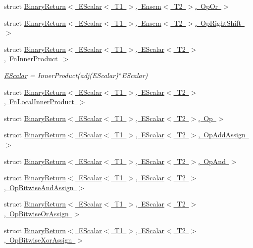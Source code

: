 \begin{DoxyCompactItemize}
\item 
struct \mbox{\hyperlink{structENSEM_1_1BinaryReturn_3_01EScalar_3_01T1_01_4_00_01Ensem_3_01T2_01_4_00_01OpOr_01_4}{Binary\+Return$<$ E\+Scalar$<$ T1 $>$, Ensem$<$ T2 $>$, Op\+Or $>$}}
\item 
struct \mbox{\hyperlink{structENSEM_1_1BinaryReturn_3_01EScalar_3_01T1_01_4_00_01Ensem_3_01T2_01_4_00_01OpRightShift_01_4}{Binary\+Return$<$ E\+Scalar$<$ T1 $>$, Ensem$<$ T2 $>$, Op\+Right\+Shift $>$}}
\item 
struct \mbox{\hyperlink{structENSEM_1_1BinaryReturn_3_01EScalar_3_01T1_01_4_00_01EScalar_3_01T2_01_4_00_01FnInnerProduct_01_4}{Binary\+Return$<$ E\+Scalar$<$ T1 $>$, E\+Scalar$<$ T2 $>$, Fn\+Inner\+Product $>$}}
\begin{DoxyCompactList}\small\item\em \mbox{\hyperlink{classENSEM_1_1EScalar}{E\+Scalar}} = Inner\+Product(adj(\+E\+Scalar)$\ast$\+E\+Scalar) \end{DoxyCompactList}\item 
struct \mbox{\hyperlink{structENSEM_1_1BinaryReturn_3_01EScalar_3_01T1_01_4_00_01EScalar_3_01T2_01_4_00_01FnLocalInnerProduct_01_4}{Binary\+Return$<$ E\+Scalar$<$ T1 $>$, E\+Scalar$<$ T2 $>$, Fn\+Local\+Inner\+Product $>$}}
\item 
struct \mbox{\hyperlink{structENSEM_1_1BinaryReturn_3_01EScalar_3_01T1_01_4_00_01EScalar_3_01T2_01_4_00_01Op_01_4}{Binary\+Return$<$ E\+Scalar$<$ T1 $>$, E\+Scalar$<$ T2 $>$, Op $>$}}
\item 
struct \mbox{\hyperlink{structENSEM_1_1BinaryReturn_3_01EScalar_3_01T1_01_4_00_01EScalar_3_01T2_01_4_00_01OpAddAssign_01_4}{Binary\+Return$<$ E\+Scalar$<$ T1 $>$, E\+Scalar$<$ T2 $>$, Op\+Add\+Assign $>$}}
\item 
struct \mbox{\hyperlink{structENSEM_1_1BinaryReturn_3_01EScalar_3_01T1_01_4_00_01EScalar_3_01T2_01_4_00_01OpAnd_01_4}{Binary\+Return$<$ E\+Scalar$<$ T1 $>$, E\+Scalar$<$ T2 $>$, Op\+And $>$}}
\item 
struct \mbox{\hyperlink{structENSEM_1_1BinaryReturn_3_01EScalar_3_01T1_01_4_00_01EScalar_3_01T2_01_4_00_01OpBitwiseAndAssign_01_4}{Binary\+Return$<$ E\+Scalar$<$ T1 $>$, E\+Scalar$<$ T2 $>$, Op\+Bitwise\+And\+Assign $>$}}
\item 
struct \mbox{\hyperlink{structENSEM_1_1BinaryReturn_3_01EScalar_3_01T1_01_4_00_01EScalar_3_01T2_01_4_00_01OpBitwiseOrAssign_01_4}{Binary\+Return$<$ E\+Scalar$<$ T1 $>$, E\+Scalar$<$ T2 $>$, Op\+Bitwise\+Or\+Assign $>$}}
\item 
struct \mbox{\hyperlink{structENSEM_1_1BinaryReturn_3_01EScalar_3_01T1_01_4_00_01EScalar_3_01T2_01_4_00_01OpBitwiseXorAssign_01_4}{Binary\+Return$<$ E\+Scalar$<$ T1 $>$, E\+Scalar$<$ T2 $>$, Op\+Bitwise\+Xor\+Assign $>$}}

\end{DoxyCompactItemize}
